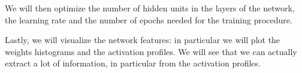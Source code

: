 We will then optimize the number of hidden units in the layers of the network, the learning rate and the number of epochs
needed for the training procedure.

Lastly, we will visualize the network features: in particular we will plot the weights histograms and the activation profiles.
We will see that we can actually extract a lot of information, in particular from the activation profiles.